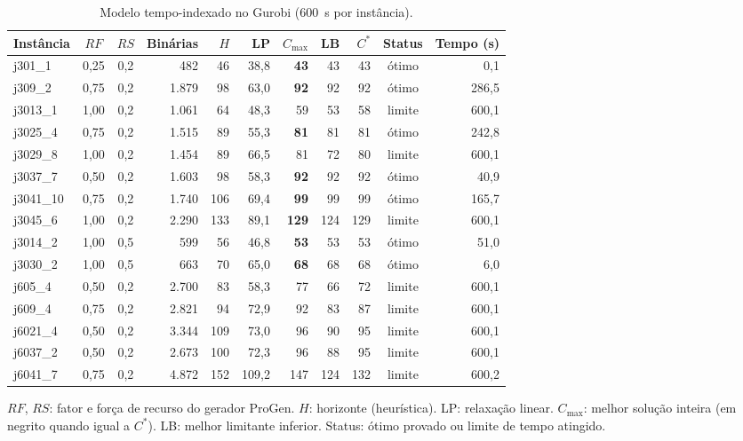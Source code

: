 \documentclass[11pt,a4paper]{article}
\newcommand{\cmax}{C_{\max}}
\begin{document}
\begin{table}[!htbp]
\centering
\small
\setlength{\tabcolsep}{4.6pt}
\caption{Modelo tempo-indexado no Gurobi (600~s por instância).}
\label{tab:exato}
\begin{tabular}{lccrrrrrrcr}
\toprule
Instância & $RF$ & $RS$ & Binárias & $H$ & LP & $\cmax$ & LB & $C^*$ & Status & Tempo (s) \\
\midrule
j301\_1   & 0,25 & 0,2 &   482 &  46 &  38,8 & \textbf{43}  &  43 &  43 & ótimo  &   0,1 \\
j309\_2   & 0,75 & 0,2 & 1.879 &  98 &  63,0 & \textbf{92}  &  92 &  92 & ótimo  & 286,5 \\
j3013\_1  & 1,00 & 0,2 & 1.061 &  64 &  48,3 & 59           &  53 &  58 & limite & 600,1 \\
j3025\_4  & 0,75 & 0,2 & 1.515 &  89 &  55,3 & \textbf{81}  &  81 &  81 & ótimo  & 242,8 \\
j3029\_8  & 1,00 & 0,2 & 1.454 &  89 &  66,5 & 81           &  72 &  80 & limite & 600,1 \\
j3037\_7  & 0,50 & 0,2 & 1.603 &  98 &  58,3 & \textbf{92}  &  92 &  92 & ótimo  &  40,9 \\
j3041\_10 & 0,75 & 0,2 & 1.740 & 106 &  69,4 & \textbf{99}  &  99 &  99 & ótimo  & 165,7 \\
j3045\_6  & 1,00 & 0,2 & 2.290 & 133 &  89,1 & \textbf{129} & 124 & 129 & limite & 600,1 \\
j3014\_2  & 1,00 & 0,5 &   599 &  56 &  46,8 & \textbf{53}  &  53 &  53 & ótimo  &  51,0 \\
j3030\_2  & 1,00 & 0,5 &   663 &  70 &  65,0 & \textbf{68}  &  68 &  68 & ótimo  &   6,0 \\
\midrule
j605\_4   & 0,50 & 0,2 & 2.700 &  83 &  58,3 & 77           &  66 &  72 & limite & 600,1 \\
j609\_4   & 0,75 & 0,2 & 2.821 &  94 &  72,9 & 92           &  83 &  87 & limite & 600,1 \\
j6021\_4  & 0,50 & 0,2 & 3.344 & 109 &  73,0 & 96           &  90 &  95 & limite & 600,1 \\
j6037\_2  & 0,50 & 0,2 & 2.673 & 100 &  72,3 & 96           &  88 &  95 & limite & 600,1 \\
j6041\_7  & 0,75 & 0,2 & 4.872 & 152 & 109,2 & 147          & 124 & 132 & limite & 600,2 \\
\bottomrule
\end{tabular}
\par\smallskip
\begin{minipage}{0.97\textwidth}\footnotesize
$RF$, $RS$: fator e força de recurso do gerador ProGen. $H$: horizonte (heurística). LP: relaxação
linear. $\cmax$: melhor solução inteira (em negrito quando igual a $C^*$). LB: melhor limitante
inferior. Status: ótimo provado ou limite de tempo atingido.
\end{minipage}
\end{table}
\end{document}
